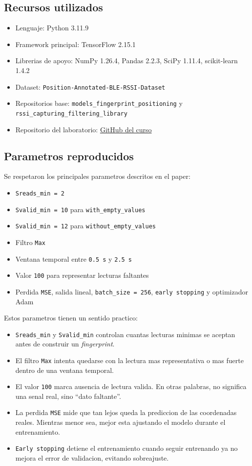\documentclass[11pt,a4paper]{article}
\begin{document}
\subsection{Recursos utilizados}
\begin{itemize}
\item Lenguaje: Python 3.11.9
\item Framework principal: TensorFlow 2.15.1
\item Librerias de apoyo: NumPy 1.26.4, Pandas 2.2.3, SciPy 1.11.4, scikit-learn 1.4.2
\item Dataset: \texttt{Position-Annotated-BLE-RSSI-Dataset}
\item Repositorios base: \texttt{models\_fingerprint\_positioning} y \texttt{rssi\_capturing\_filtering\_library}
\item Repositorio del laboratorio: \href{https://github.com/eduardo202020/cib12-aprendizaje-maquina-mineria-datos}{GitHub del curso}
\end{itemize}

\subsection{Parametros reproducidos}
Se respetaron los principales parametros descritos en el paper:
\begin{itemize}
\item \texttt{Sreads\_min = 2}
\item \texttt{Svalid\_min = 10} para \texttt{with\_empty\_values}
\item \texttt{Svalid\_min = 12} para \texttt{without\_empty\_values}
\item Filtro \texttt{Max}
\item Ventana temporal entre \texttt{0.5 s} y \texttt{2.5 s}
\item Valor \texttt{100} para representar lecturas faltantes
\item Perdida \texttt{MSE}, salida lineal, \texttt{batch\_size = 256}, \texttt{early stopping} y optimizador Adam
\end{itemize}

Estos parametros tienen un sentido practico:
\begin{itemize}
\item \texttt{Sreads\_min} y \texttt{Svalid\_min} controlan cuantas lecturas minimas se aceptan antes de construir un \textit{fingerprint}.
\item El filtro \texttt{Max} intenta quedarse con la lectura mas representativa o mas fuerte dentro de una ventana temporal.
\item El valor \texttt{100} marca ausencia de lectura valida. En otras palabras, no significa una senal real, sino ``dato faltante''.
\item La perdida \texttt{MSE} mide que tan lejos queda la prediccion de las coordenadas reales. Mientras menor sea, mejor esta ajustando el modelo durante el entrenamiento.
\item \texttt{Early stopping} detiene el entrenamiento cuando seguir entrenando ya no mejora el error de validacion, evitando sobreajuste.
\end{itemize}
\end{document}
